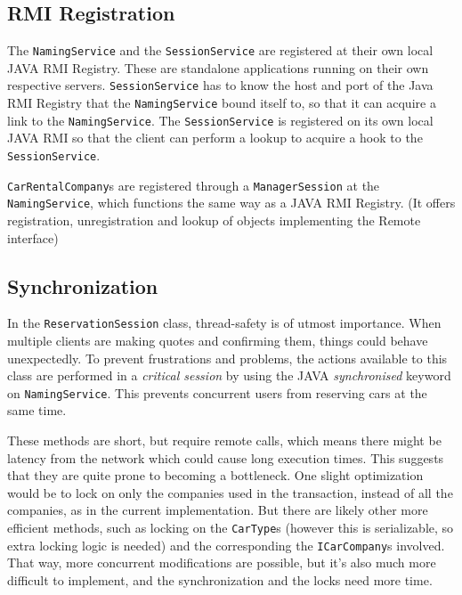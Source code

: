 \documentclass[a4paper]{article}
\begin{document}
\subsection{RMI Registration}
The \texttt{NamingService} and the \texttt{SessionService} are registered at their own local JAVA RMI Registry. These are standalone applications running on their own respective servers. \texttt{SessionService} has to know the host and port of the Java RMI Registry that the \texttt{NamingService} bound itself to, so that it can acquire a link to the \texttt{NamingService}. The \texttt{SessionService} is registered on its own local JAVA RMI so that the client can perform a lookup to acquire a hook to the \texttt{SessionService}.

\texttt{CarRentalCompany}s are registered through a \texttt{ManagerSession} at the \texttt{NamingService}, which functions the same way as a JAVA RMI Registry. (It offers registration, unregistration and lookup of objects implementing the Remote interface)

\subsection{Synchronization}
In the \texttt{ReservationSession} class, thread-safety is of utmost importance. When multiple clients are making quotes and confirming them, things could behave unexpectedly. To prevent frustrations and problems, the actions available to this class are performed in a \emph{critical session} by using the JAVA \emph{synchronised} keyword on \texttt{NamingService}. This prevents concurrent users from reserving cars at the same time.

These methods are short, but require remote calls, which means there might be latency from the network which could cause long execution times. This suggests that they are quite prone to becoming a bottleneck. One slight optimization would be to lock on only the companies used in the transaction, instead of all the companies, as in the current implementation. But there are likely other more efficient methods, such as locking on the \texttt{CarType}s (however this is serializable, so extra locking logic is needed) and the corresponding the \texttt{ICarCompany}s involved. That way, more concurrent modifications are possible, but it's also much more difficult to implement, and the synchronization and the locks need more time.
\end{document}
